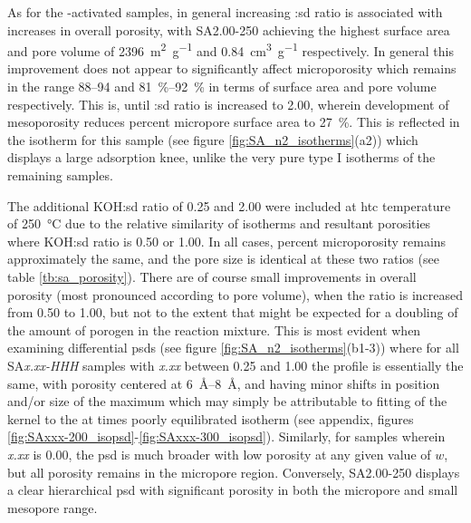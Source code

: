 As for the -activated samples, in general increasing :\acrshort{sd} ratio is associated with increases in overall porosity, with SA2.00-250 achieving the highest surface area and pore volume of \qty{2396}{\metre\squared\per\gram} and \qty{0.84}{\cm\cubed\per\gram} respectively. In general this improvement does not appear to significantly affect microporosity which remains in the range \numrange[range-phrase={-}]{88}{94} and \qtyrange[range-units=single, range-phrase={-}]{81}{92}{\percent} in terms of surface area and pore volume respectively. This is, until :\acrshort{sd} ratio is increased to \num{2.00}, wherein development of mesoporosity reduces percent micropore surface area to \qty{27}{\percent}. This is reflected in the  isotherm for this sample (see figure \ref{fig:SA_n2_isotherms}(a2)) which displays a large \gls{adsorption} knee, unlike the very pure type I isotherms\citep{Thommes2015Physisorption} of the remaining samples.

The additional KOH:\acrshort{sd} ratio of 0.25 and 2.00 were included at \gls{htc} temperature of \qty{250}{\degreeCelsius} due to the relative similarity of isotherms and resultant porosities where KOH:\acrshort{sd} ratio is 0.50 or 1.00. In all cases, percent microporosity remains approximately the same, and the pore size is identical at these two ratios (see table \ref{tb:sa_porosity}). There are of course small improvements in overall porosity (most pronounced according to pore volume), when the ratio is increased from 0.50 to 1.00, but not to the extent that might be expected for a doubling of the amount of \gls{porogen} in the reaction mixture. This is most evident when examining differential \glspl{psd} (see figure \ref{fig:SA_n2_isotherms}(b1-3)) where for all SA\textit{x.xx-HHH} samples with \textit{x.xx} between 0.25 and 1.00 the profile is essentially the same, with porosity centered at \qtyrange[range-units=single, range-phrase={-}]{6}{8}{\angstrom}, and having minor shifts in position and/or size of the maximum which may simply be attributable to fitting of the kernel to the at times poorly equilibrated isotherm (see appendix, figures \ref{fig:SAxxx-200_isopsd}-\ref{fig:SAxxx-300_isopsd}). Similarly, for samples wherein \textit{x.xx} is 0.00, the \gls{psd} is much broader with low porosity at any given value of $w$, but all porosity remains in the \gls{micropore} region. Conversely, SA2.00-250 displays a clear hierarchical \gls{psd} with significant porosity in both the \gls{micropore} and small \gls{mesopore} range. 



